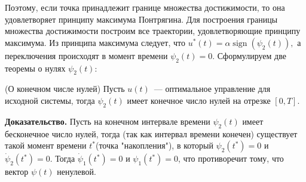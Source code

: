 \documentclass[11pt]{article}
\DeclareMathOperator{\sign}{sign}
\begin{document}
 	{Поэтому, если точка принадлежит границе множества достижимости, то она удовлетворяет принципу максимума Понтрягина. Для построения границы множества достижимости построим все траектории, удовлетворяющие принципу максимума. }
 	\newpage
 	{Из принципа максимума следует, что $u^*(t) = \alpha\sign(\psi_2(t)),$ а переключения происходят в момент времени $\psi_2(t) = 0.$}
 	\newline
 	{Сформулируем две теоремы о нулях $\psi_2(t):$}
 	\begin{theorem}
 		{(О конечном числе нулей) Пусть $u(t)$~--- оптимальное управление для исходной системы, тогда $\psi_2(t)$ имеет конечное число нулей на отрезке $[0, T].$}
 		
    \end{theorem}	
 		{\textbf{Доказательство.} Пусть на  конечном интервале времени $\psi_2(t)$ имеет бесконечное число нулей, тогда (так как интервал времени конечен) существует такой момент времени $t^*$(точка "накопления"), в который $\psi_2(t^*) = 0$ и $\dot \psi_2(t^*) = 0.$ Тогда $\dot \psi_1(t^*) = 0$ и $\psi_1(t^*) = 0$, что противоречит тому, что вектор $\psi(t)$ ненулевой.} 
 	
\end{document}
